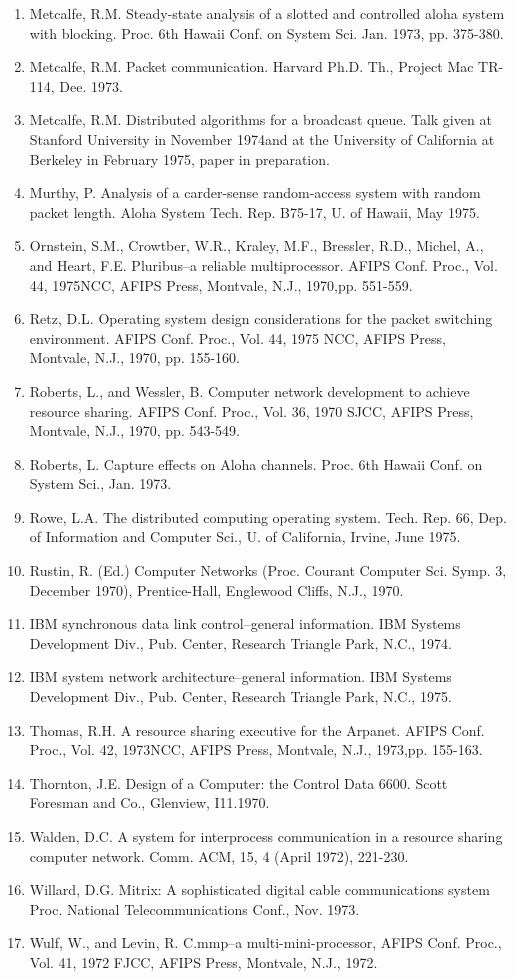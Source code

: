 \begin{enumerate}
	\item	 Metcalfe, R.M. Steady-state analysis of a slotted and controlled aloha system with blocking. Proc. 6th Hawaii Conf. on System Sci. Jan. 1973, pp. 375-380.
	\item	Metcalfe, R.M. Packet communication. Harvard Ph.D. Th., Project Mac TR-114, Dee. 1973.
	\item	Metcalfe, R.M. Distributed algorithms for a broadcast queue. Talk given at Stanford University in November 1974and at the University of California at Berkeley in February 1975, paper in preparation.
	\item	Murthy, P. Analysis of a carder-sense random-access system with random packet length. Aloha System Tech. Rep. B75-17, U. of Hawaii, May 1975.
	\item	Ornstein, S.M., Crowtber, W.R., Kraley, M.F., Bressler, R.D., Michel, A., and Heart, F.E. Pluribus--a reliable multiprocessor. AFIPS Conf. Proc., Vol. 44, 1975NCC, AFIPS Press, Montvale, N.J., 1970,pp. 551-559.
	\item	Retz, D.L. Operating system design considerations for the packet switching environment. AFIPS Conf. Proc., Vol. 44, 1975 NCC, AFIPS Press, Montvale, N.J., 1970, pp. 155-160.
	\item	Roberts, L., and Wessler, B. Computer network development to achieve resource sharing. AFIPS Conf. Proc., Vol. 36, 1970 SJCC, AFIPS Press, Montvale, N.J., 1970, pp. 543-549.
	\item	Roberts, L. Capture effects on Aloha channels. Proc. 6th Hawaii Conf. on System Sci., Jan. 1973.
	\item	Rowe, L.A. The distributed computing operating system. Tech. Rep. 66, Dep. of Information and Computer Sci., U. of California, Irvine, June 1975.
	\item	Rustin, R. (Ed.) Computer Networks (Proc. Courant Computer Sci. Symp. 3, December 1970), Prentice-Hall, Englewood Cliffs, N.J., 1970.
	\item	IBM synchronous data link control--general information. IBM Systems Development Div., Pub. Center, Research Triangle Park, N.C., 1974.
	\item	IBM system network architecture--general information.
IBM Systems Development Div., Pub. Center, Research Triangle Park, N.C., 1975.
	\item	Thomas, R.H. A resource sharing executive for the Arpanet. AFIPS Conf. Proc., Vol. 42, 1973NCC, AFIPS Press, Montvale, N.J., 1973,pp. 155-163.
	\item	Thornton, J.E. Design of a Computer: the Control Data 6600. Scott Foresman and Co., Glenview, I11.1970.
	\item	Walden, D.C. A system for interprocess communication in a resource sharing computer network. Comm. ACM, 15, 4 (April 1972), 221-230.
	\item	Willard, D.G. Mitrix: A sophisticated digital cable communications system Proc. National Telecommunications Conf., Nov. 1973.
	\item	Wulf, W., and Levin, R. C.mmp--a multi-mini-processor, AFIPS Conf. Proc., Vol. 41, 1972 FJCC, AFIPS Press, Montvale, N.J., 1972.
\end{enumerate}


 
%

